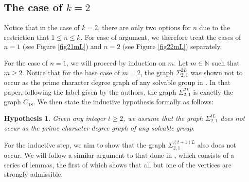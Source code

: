 \documentclass[11pt]{amsart}
\newtheorem{hyp}[theorem]{Hypothesis}
\theoremstyle{definition}
\theoremstyle{remark}
\numberwithin{equation}{section}
\newcommand{\SLi}[3]{\Sigma_{#1,#2}^{#3L}} %
\begin{document}
\subsection{The case of $k=2$}

Notice that in the case of $k=2$, there are only two options for $n$ due to the restriction that $1\leq n\leq k$. For ease of argument, we therefore treat the cases of $n=1$ (see Figure \ref{fig21mL}) and $n=2$ (see Figure \ref{fig22mL}) separately.

For the case of $n=1$, we will proceed by induction on $m$. Let $m\in\mathbb{N}$ such that $m\geq2$. Notice that for the base case of $m=2$, the graph $\SLi{2}{1}{2}$ was shown not to occur as the prime character degree graph of any solvable group in \cite{LMS}. In that paper, following the label given by the authors, the graph $\SLi{2}{1}{2}$ is exactly the graph $C_{18}$. We then state the inductive hypothesis formally as follows:

\begin{hyp}\label{hyp21mL}
Given any integer $t\geq2$, we assume that the graph $\SLi{2}{1}{t}$ does not occur as the prime character degree graph of any solvable group.
\end{hyp}

For the inductive step, we aim to show that the graph $\SLi{2}{1}{(t+1)}$ also does not occur. We will follow a similar argument to that done in \cite{LMS}, which consists of a series of lemmas, the first of which shows that all but one of the vertices are strongly admissible.
\end{document}
